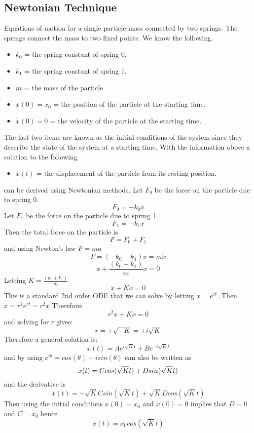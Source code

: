 \subsection{Newtonian Technique}
\label{sec:NewtonianTechnique}
Equations of motion for a single particle mass connected by two springs. The
springs connect the mass to two fixed points. We know the following.
\begin{itemize}
\item $k_{0}$ = the spring constant of spring 0.
\item $k_{1}$ = the spring constant of spring 1.
\item $m$ = the mass of the particle.
\item $x(0) = x_0$ = the position of the particle at the starting time.
\item $\dot{x}(0) = 0$ = the velocity of the particle at the starting time.
\end{itemize}
The last two items are known as the initial conditions of the system since they
describe the state of the system at a starting time. With the information above
a solution to the following
\begin{itemize}
\item $x(t)$ = the displacement of the particle from its resting position.
\end{itemize}
can be derived using Newtonian methods.
Let $F_{0}$ be the force on the particle due to spring 0.
\begin{equation}
	F_{0} = -k_{0}x
\end{equation}
Let $F_{1}$ be the force on the particle due to spring 1.
\begin{equation}
	F_{1} = -k_{1}x
\end{equation}
Then the total force on the particle is
\begin{equation}
	F = F_{0} + F_{1}
\end{equation}
and using Newton's law $F = ma$
\[F = (-k_{0} - k_{1})x = m\ddot{x}	\]
\[\ddot{x} + \frac{(k_{0} + k_{1})}{m}x = 0\]
Letting $K = \frac{(k_{0} + k_{1})}{m}$
\begin{equation}
	\label{eqn_motion}
	\ddot{x} + Kx = 0
\end{equation}
This is a standard 2nd order ODE that we can solve by letting $x = e^{rt}$.
Then $\ddot{x} = r^{2}e^{rt} = r^{2}x$ Therefore:
\[
	r^{2}x + Kx = 0
\]
and solving for r gives:
\[r = \pm\sqrt{-K} = \pm i \sqrt{K}\]
Therefore a general solution is:
\[
	x(t) = Ae^{i\sqrt{K}t} + Be^{-i\sqrt{K}t}	
\]
and by using $e^{i\theta} = cos(\theta) + isin(\theta)$ can also be written as
\[
	x(t) = Ccos(\sqrt{K}t) + Dsin(\sqrt{K}t)\\	
\]
and the derivative is
\[
	\dot{x}(t) = -\sqrt{K}Csin(\sqrt{K}t) + \sqrt{K}Dcos(\sqrt{K}t)
\]
Then using the initial conditions $x(0)=x_0$ and $\dot{x}(0) = 0$ implies that
$D=0$ and $C=x_0$ hence
\begin{equation}
	x(t) = x_0cos(\sqrt{K}t)
\end{equation}

